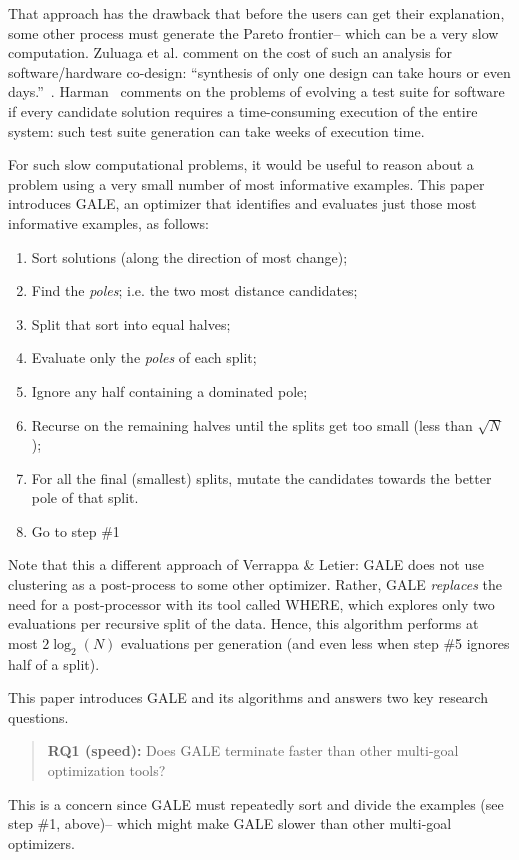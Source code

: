 \documentclass[10pt,journal,compsoc]{IEEEtran}
\newcommand{\be}{\begin{enumerate}}
\newcommand{\ee}{\end{enumerate}}
\newenvironment{changed}{\par\color{MyDarkBlue}}{\par}
\begin{document}
That approach has the drawback that
before the users can get their explanation,
some other process must generate the Pareto frontier-- which can be a
very slow computation.  Zuluaga et
al. comment on the cost of such an analysis for
software/hardware co-design: ``synthesis of only one
design can take hours or even
days.''~\cite{Zuluaga:13}.  Harman~\cite{harm13}
comments on the problems of evolving a test suite
for software if every candidate solution requires a
time-consuming execution of the entire system: such
test suite generation can take weeks of execution
time. 

For such slow computational problems, it
would be useful to reason about a problem
using a very small number of most informative
examples. This paper introduces GALE, 
an optimizer that 
identifies and evaluates just those
most informative
examples, as follows:
\begin{changed}
\be
\item Sort solutions (along the direction of most change);
\item Find the {\em poles}; i.e. the two most distance candidates;
\item Split that sort into equal halves;
\item Evaluate only the {\em poles} of each split;
\item Ignore any half containing a dominated pole;
\item Recurse on the remaining halves until the splits get too small (less than $\sqrt{N}$);
\item For all the final (smallest) splits,
  mutate the candidates towards the better pole of
  that split. 
\item Go to step \#1 \ee 
\end{changed}
\noindent
Note that  this a different approach
of Verrappa \& Letier:
GALE does not use clustering as a post-process to some other optimizer.
Rather, GALE {\em replaces} the need for a post-processor with its tool called WHERE, which explores only two evaluations per recursive split
of the data. Hence, this algorithm
performs at most $2{\log_2}(N)$ evaluations per
generation (and even less when step \#5 ignores half of a split).

This paper introduces GALE and its algorithms and 
answers two key research questions.
\begin{quote}
{\bf RQ1 (speed):} Does GALE terminate faster than other multi-goal optimization tools?
\end{quote}
This is a concern since GALE
must  repeatedly sort and divide  the examples (see step \#1, above)--
which might  make  GALE  slower than other multi-goal optimizers.
\end{document}
